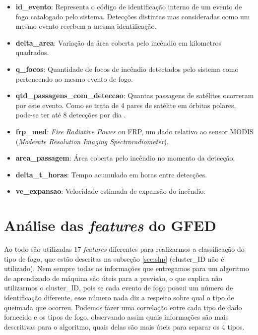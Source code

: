 \begin{multicols}{2}
    


\begin{itemize}
\item \textbf{id\_evento}: Representa o código de identificação interno de um evento de fogo catalogado pelo sistema. Detecções distintas mas consideradas como um mesmo evento recebem a mesma identificação.
\item \textbf{delta\_area}: Variação da área coberta pelo incêndio em kilometros quadrados.
\item \textbf{q\_focos}: Quantidade de focos de incêndio detectados pelo sistema como pertencendo ao mesmo evento de fogo.
\item \textbf{qtd\_passagens\_com\_deteccao}: Quantas passagens de satélites ocorreram por este evento. Como se trata de 4 pares de satélite em órbitas polares, pode-se ter até 8 detecções por dia \cite{painel-fogo}.
\item \textbf{frp\_med}: \textit{Fire Radiative Power} ou FRP, um dado relativo ao sensor MODIS (\textit{Moderate Resolution Imaging Spectroradiometer}).
\item \textbf{area\_passagem}: Área coberta pelo incêndio no momento da detecção;
\item \textbf{delta\_t\_horas}: Tempo acumulado em horas entre detecções.
\item \textbf{ve\_expansao}: Velocidade estimada de expansão do incêndio.

\end{itemize}

\end{multicols}

\section{Análise das \textit{features} do GFED}
\label{sec:features}

Ao todo são utilizadas 17 \textit{features} diferentes para realizarmos a classificação do tipo de fogo, que estão descritas na subseção \ref{sec:shp} (cluster\_ID não é utilizado). Nem sempre todas as informações que entregamos para um algoritmo de aprendizado de máquina são úteis para a previsão, o que explica não utilizarmos o cluster\_ID, pois se cada evento de fogo possui um número de identificação diferente, esse número nada diz a respeito sobre qual o tipo de queimada que ocorreu. Podemos fazer uma correlação entre cada tipo de dado fornecido e os tipos de fogo, observando assim quais informações são mais descritivas para o algoritmo, quais delas são mais úteis para separar os 4 tipos.

